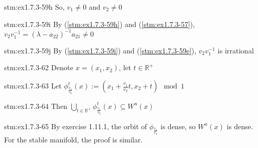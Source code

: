 \begin{statement}{stm:ex1.7.3-59h}
So, $v_1 \ne 0$ and $v_2 \ne 0$
\end{statement}

\begin{statement}{stm:ex1.7.3-59i}
By (\ref{stm:ex1.7.3-59h}) and (\ref{stm:ex1.7.3-57}), $v_2 v_1^{-1} = (\lambda - a_{22})^{-1} a_{21} \ne 0$
\end{statement}

\begin{statement}{stm:ex1.7.3-59j}
By (\ref{stm:ex1.7.3-59i}) and (\ref{stm:ex1.7.3-59e}), $v_2 v_1^{-1}$ is irrational
\end{statement}

\begin{statement}{stm:ex1.7.3-62}
Denote $x = (x_1, x_2)$, let $t \in \mathbb{R}^+$
\end{statement}

\begin{statement}{stm:ex1.7.3-63}
Let $\phi_{\frac{v_1}{v_2}}^t(x) := (x_1 + \frac{v_1}{v_2} t, x_2 + t) \mod 1$
\end{statement}

\begin{statement}{stm:ex1.7.3-64}
Then $\bigcup_{t \in \mathbb{R}^+} \phi_{\frac{v_1}{v_2}}^t(x) \subseteq W^u(x)$
\end{statement}

\begin{statement}{stm:ex1.7.3-65}
By exercise 1.11.1, the orbit of $\phi_{\frac{v_1}{v_2}}$ is dense, so $W^u(x)$ is dense. For the stable manifold, the proof is similar.
\end{statement}
